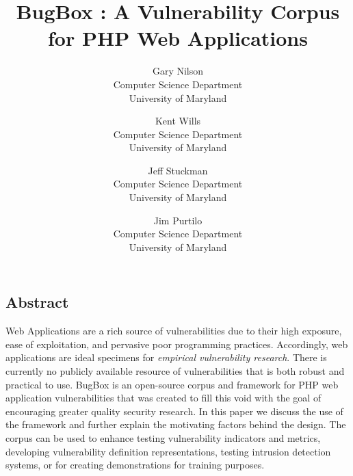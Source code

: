 \documentclass[letterpaper,twocolumn,10pt]{article}
\begin{document}
\date{}


\title{\Large \bf BugBox : A Vulnerability Corpus for PHP Web Applications}


\author{
{\rm Gary Nilson}\\
Computer Science Department\\University of Maryland
\and
{\rm Kent Wills}\\
Computer Science Department\\University of Maryland
\and
{\rm Jeff Stuckman}\\
Computer Science Department\\University of Maryland
\and
{\rm Jim Purtilo}\\
Computer Science Department\\University of Maryland
} %

\maketitle

\thispagestyle{empty}

\subsection*{Abstract}
Web Applications are a rich source of vulnerabilities due to their high exposure, ease of exploitation, and pervasive poor programming practices. Accordingly, web applications are ideal specimens for \emph{empirical vulnerability research}. There is currently no publicly available resource of vulnerabilities that is both robust and practical to use. BugBox is an open-source corpus and framework for PHP web application vulnerabilities that was created to fill this void with the goal of encouraging greater quality security research. In this paper we discuss the use of the framework and further explain the motivating factors behind the design. The corpus can be used to enhance testing vulnerability indicators and metrics, developing vulnerability definition representations, testing intrusion detection systems, or for creating demonstrations for training purposes.  
\end{document}
